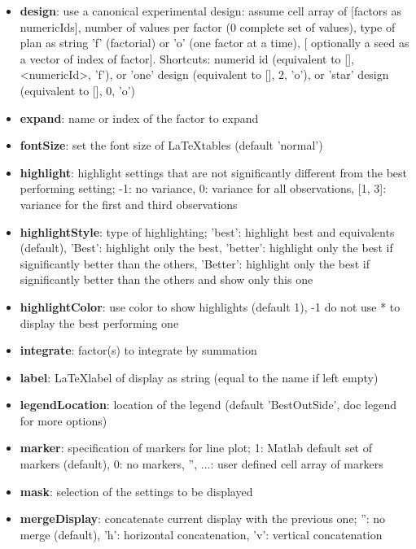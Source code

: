 \documentclass[a4paper,fleqn]{tufte-handout}
\begin{document}
\begin{itemize}
\item \textbf{design}: use a canonical experimental design: assume cell array of {[factors as numericIds], number of values per factor (0 complete set of values), type of plan as string 'f' (factorial) or 'o' (one factor at a time), [ optionally a seed as a vector of index of factor]}. Shortcuts: numerid id (equivalent to {[], <numericId>}, 'f'), or 'one' design (equivalent to {[], 2, 'o'}), or 'star' design (equivalent to {[], 0, 'o'})
\item \textbf{expand}: name or index of the factor to expand                 
\item \textbf{fontSize}:  set the font size of \LaTeX tables (default 'normal')                
\item \textbf{highlight}:  highlight settings that are not significantly
    	different from the best performing setting;
       -1: no variance,
    	0: variance for all observations,
    	[1, 3]: variance for the first and third observations 
\item \textbf{highlightStyle}:  type of highlighting;
        'best': highlight best and equivalents (default),
        'Best': highlight only the best,
        'better': highlight only the best if significantly better than
           the others,
        'Better': highlight only the best if significantly better than
           the others and show only this one                
\item \textbf{highlightColor}: use color to show highlights (default 1), -1 do
       not use * to display the best performing one                 
\item \textbf{integrate}:  factor(s) to integrate by summation 
\item \textbf{label}: \LaTeX label of display as string (equal to the name if left empty)             
\item \textbf{legendLocation}: location of the legend (default 'BestOutSide', doc legend for more options)                 
\item \textbf{marker}:  specification of markers for line plot;
           1: Matlab default set of markers (default),
           0: no markers,
           {'', ...}: user defined cell array of markers 
\item \textbf{mask}:    selection of the settings to be displayed              
\item \textbf{mergeDisplay}: concatenate current display with the previous one;
        '': no merge (default),
        'h': horizontal concatenation,
        'v': vertical concatenation                 

\end{itemize}
\end{document}
